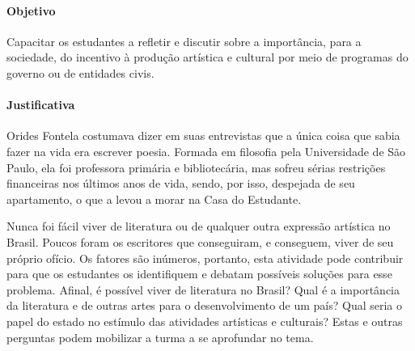 \documentclass[12pt]{extarticle}
\begin{document}
\paragraph{Objetivo} Capacitar os estudantes a refletir e discutir sobre a
importância, para a sociedade, do incentivo à produção artística e
cultural por meio de programas do governo ou de entidades civis.

\paragraph{Justificativa} Orides Fontela costumava dizer em suas
entrevistas que a única coisa que sabia fazer na vida era escrever
poesia. Formada em filosofia pela Universidade de São Paulo, ela foi
professora primária e bibliotecária, mas sofreu sérias restrições
financeiras nos últimos anos de vida, sendo, por isso, despejada de seu
apartamento, o que a levou a morar na Casa do Estudante.

Nunca foi fácil viver de literatura ou de qualquer outra expressão
artística no Brasil. Poucos foram os escritores que conseguiram, e
conseguem, viver de seu próprio ofício. Os fatores são inúmeros,
portanto, esta atividade pode contribuir para que os estudantes os
identifiquem e debatam possíveis soluções para esse problema. Afinal, é
possível viver de literatura no Brasil? Qual é a importância da
literatura e de outras artes para o desenvolvimento de um país? Qual
seria o papel do estado no estímulo das atividades artísticas e
culturais? Estas e outras perguntas podem mobilizar a turma a se
aprofundar no tema.
\end{document}

